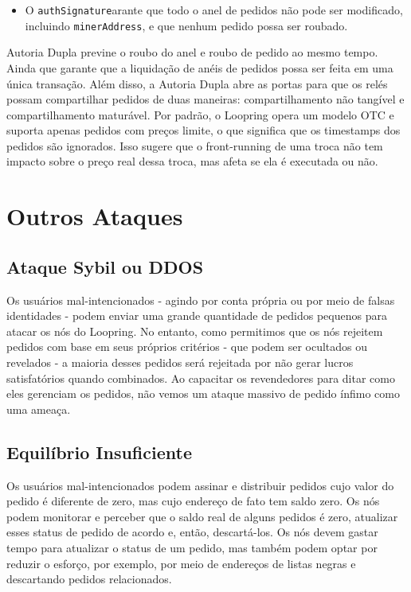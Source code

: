 \documentclass[UTF8,nofonts]{article}
\begin{document}
\begin{multicols}{2}
\begin{itemize}
	\item  O \verb|authSignature|arante que todo o anel de pedidos não pode ser modificado, incluindo \verb|minerAddress|, e que nenhum pedido possa ser roubado.

\end{itemize}

Autoria Dupla previne o roubo do anel e roubo de pedido ao mesmo tempo. Ainda que garante que a liquidação de anéis de pedidos possa ser feita em uma única transação. Além disso, a Autoria Dupla abre as portas para que os relés possam compartilhar pedidos de duas maneiras: compartilhamento não tangível e compartilhamento maturável. Por padrão, o Loopring opera um modelo OTC e suporta apenas pedidos com preços limite, o que significa que os timestamps dos pedidos são ignorados. Isso sugere que o front-running de uma troca não tem impacto sobre o preço real dessa troca, mas afeta se ela é executada ou não.


\section{Outros Ataques}

\subsection{Ataque Sybil ou DDOS}

Os usuários mal-intencionados - agindo por conta própria ou por meio de falsas identidades - podem enviar uma grande quantidade de pedidos pequenos para atacar os nós do Loopring. No entanto, como permitimos que os nós rejeitem pedidos com base em seus próprios critérios - que podem ser ocultados ou revelados - a maioria desses pedidos será rejeitada por não gerar lucros satisfatórios quando combinados. Ao capacitar os revendedores para ditar como eles gerenciam os pedidos, não vemos um ataque massivo de pedido ínfimo como uma ameaça.

\subsection{Equilíbrio Insuficiente}

Os usuários mal-intencionados podem assinar e distribuir pedidos cujo valor do pedido é diferente de zero, mas cujo endereço de fato tem saldo zero. Os nós podem monitorar e perceber que o saldo real de alguns pedidos é zero, atualizar esses status de pedido de acordo e, então, descartá-los. Os nós devem gastar tempo para atualizar o status de um pedido, mas também podem optar por reduzir o esforço, por exemplo, por meio de endereços de listas negras e descartando pedidos relacionados.


\end{multicols}
\end{document}
